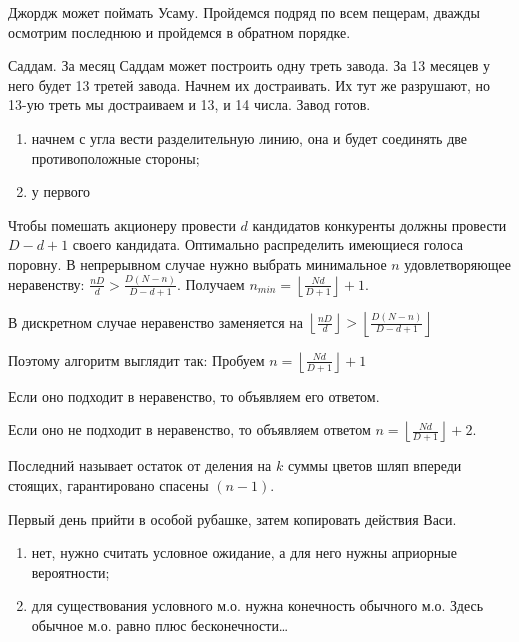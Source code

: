 \begin{solution}{2.1}
Джордж может поймать Усаму. Пройдемся подряд по всем пещерам, дважды осмотрим последнюю и пройдемся в обратном порядке.
\end{solution}
\begin{solution}{2.2}
Саддам. За месяц Саддам может построить одну треть завода. За 13 месяцев у него будет 13 третей завода. Начнем их достраивать. Их тут же разрушают, но 13-ую треть мы достраиваем и 13, и 14 числа. Завод готов.
\end{solution}
\begin{solution}{2.3}
\begin{enumerate}
\item начнем с угла вести разделительную линию, она и будет соединять две противоположные стороны;
\item у первого
\end{enumerate}
\end{solution}
\begin{solution}{2.4}

Чтобы помешать акционеру провести $d$ кандидатов конкуренты должны провести $D-d+1$ своего кандидата. Оптимально распределить имеющиеся голоса поровну.
В непрерывном случае нужно выбрать минимальное $n$ удовлетворяющее неравенству: $\frac{nD}{d}>\frac{D(N-n)}{D-d+1}$. Получаем $n_{min}= \left\lfloor \frac{Nd}{D+1}\right\rfloor+1$. \par
В дискретном случае неравенство заменяется на
$\left\lfloor \frac{nD}{d}\right\rfloor>\left\lfloor \frac{D(N-n)}{D-d+1}\right\rfloor$ \par
Поэтому алгоритм выглядит так:
Пробуем $n=\left\lfloor \frac{Nd}{D+1}\right\rfloor+1$ \par
Если оно подходит в неравенство, то объявляем его ответом. \par
Если оно не подходит в неравенство, то объявляем ответом $n=\left\lfloor \frac{Nd}{D+1}\right\rfloor+2$.
\end{solution}
\begin{solution}{2.5}
Последний называет остаток от деления на $k$ суммы цветов шляп впереди стоящих, гарантировано спасены $(n-1)$.
\end{solution}
\begin{solution}{2.6}
Первый день прийти в особой рубашке, затем копировать действия Васи.
\end{solution}
\begin{solution}{2.7}
\begin{enumerate}
\item
 нет, нужно считать условное ожидание, а для него нужны априорные вероятности;
 \item для существования условного м.о. нужна конечность обычного м.о. Здесь обычное м.о. равно плюс бесконечности\ldots
\end{enumerate}
\end{solution}

